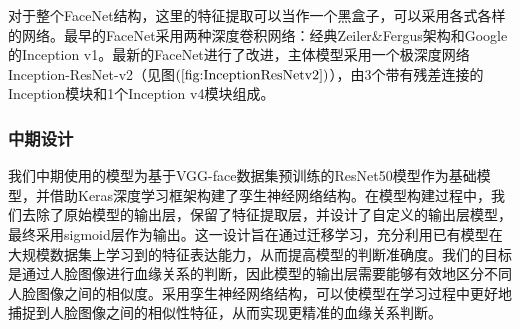 \documentclass[UTF8]{ctexart}
\begin{document}
对于整个FaceNet结构，这里的特征提取可以当作一个黑盒子，可以采用各式各样的网络。最早的FaceNet采用两种深度卷积网络：经典Zeiler\&Fergus架构和Google的Inception v1。最新的FaceNet进行了改进，主体模型采用一个极深度网络Inception-ResNet-v2（见图$\left(\ref{fig:InceptionResNetv2}\right)$），由3个带有残差连接的Inception模块和1个Inception v4模块组成。


\subsubsection{中期设计}
我们中期使用的模型为基于VGG-face数据集预训练的ResNet50模型作为基础模型，并借助Keras深度学习框架构建了孪生神经网络结构。在模型构建过程中，我们去除了原始模型的输出层，保留了特征提取层，并设计了自定义的输出层模型，最终采用sigmoid层作为输出。这一设计旨在通过迁移学习，充分利用已有模型在大规模数据集上学习到的特征表达能力，从而提高模型的判断准确度。我们的目标是通过人脸图像进行血缘关系的判断，因此模型的输出层需要能够有效地区分不同人脸图像之间的相似度。采用孪生神经网络结构，可以使模型在学习过程中更好地捕捉到人脸图像之间的相似性特征，从而实现更精准的血缘关系判断。
\end{document}
